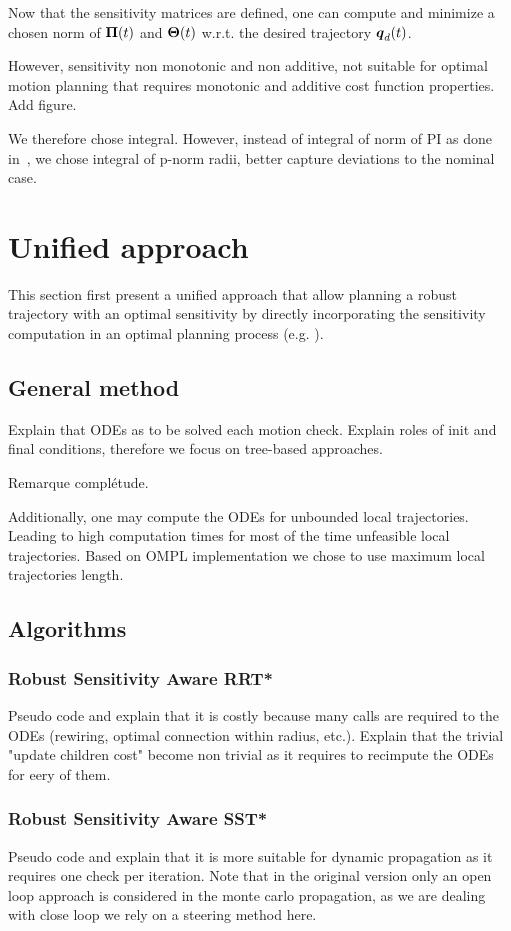 Now that the sensitivity matrices are defined, one can compute and minimize a chosen norm of $\boldsymbol{\Pi}(t)$ and $\boldsymbol{\Theta}(t)$ w.r.t. the desired trajectory $\boldsymbol{q}_d(t)$.

However, sensitivity non monotonic and non additive, not suitable for optimal motion planning that requires monotonic and additive cost function properties.
Add figure.

We therefore chose integral.
However, instead of integral of norm of PI as done in~\cite{cPi,cTh}, we chose integral of p-norm radii, better capture deviations to the nominal case.

\section{Unified approach}

This section first present a unified approach that allow planning a robust trajectory with an optimal sensitivity by directly incorporating the sensitivity computation in an optimal planning process (e.g. ).

\subsection{General method}
Explain that ODEs as to be solved each motion check.
Explain roles of init and final conditions, therefore we focus on tree-based approaches.

Remarque complétude.

Additionally, one may compute the ODEs for unbounded local trajectories. 
Leading to high computation times for most of the time unfeasible local trajectories. 
Based on OMPL implementation we chose to use maximum local trajectories length.

\subsection{Algorithms}
\subsubsection{Robust Sensitivity Aware RRT*}
Pseudo code and explain that it is costly because many calls are required to the ODEs (rewiring, optimal connection within radius, etc.).
Explain that the trivial "update children cost" become non trivial as it requires to recimpute the ODEs for eery of them.
\subsubsection{Robust Sensitivity Aware SST*}
Pseudo code and explain that it is more suitable for dynamic propagation as it requires one check per iteration.
Note that in the original version only an open loop approach is considered in the monte carlo propagation, as we are dealing with close loop we rely on a steering method here.

